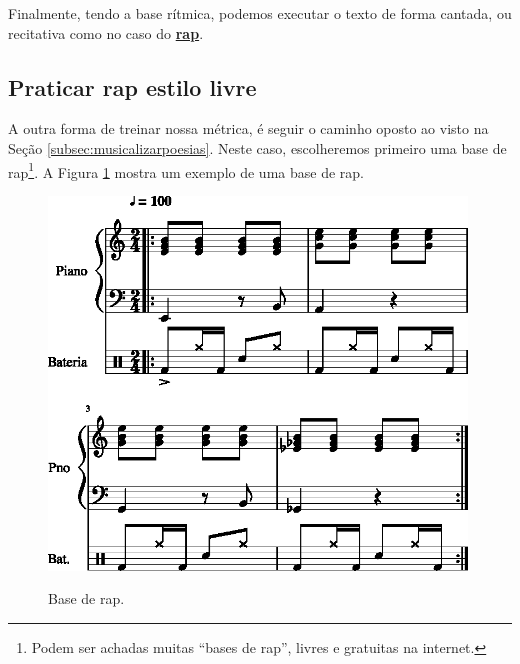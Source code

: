 Finalmente, tendo a base rítmica, podemos executar o texto de forma cantada,
ou recitativa como no caso do \hyperref[ref:RAP]{\textbf{rap}}.

\subsection{Praticar rap estilo livre}
\label{subsec:praticarrap}
A outra forma de treinar nossa métrica, 
é seguir o caminho oposto ao visto na Seção \ref{subsec:musicalizarpoesias}.
Neste caso, escolheremos primeiro uma base de rap\footnote{Podem ser achadas muitas ``bases de rap'',
livres e gratuitas na internet.}.
A Figura \ref{rap:base-rap} mostra um exemplo de uma base de rap.

\begin{figure}[h!]
\centering
    \centering
    \href{https://drive.google.com/file/d/1Ikxb9BU7HTyFZzzeoaMIAt75ceeJdNNT/view?usp=sharing}{\includegraphics[width=0.99\textwidth]{chapters/cap-musicalidade-tecnica/base-rap-1.eps}}
\caption{Base de rap.}
\label{rap:base-rap}
\end{figure}


